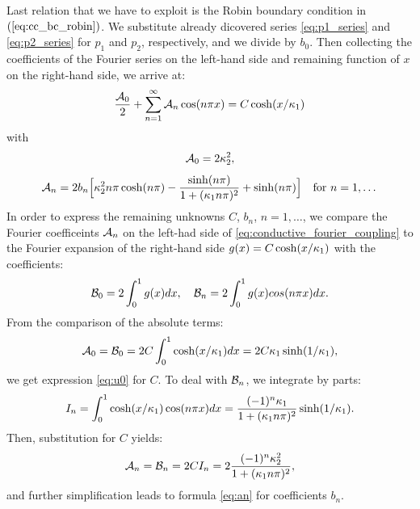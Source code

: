 \documentclass[sn-mathphys,Numbered]{sn-jnl}
\def\prtl{\partial} %
\begin{document}
Last relation that we have to exploit is the Robin boundary condition in $(\ref{eq:cc_bc_robin})$. We substitute already dicovered series \eqref{eq:p1_series} and \eqref{eq:p2_series} for $p_1$ and $p_2$, respectively, and we divide by $b_0$. Then collecting the coefficients of the Fourier series on the left-hand side and remaining function of $x$ on the right-hand side, we arrive at:
\begin{equation}
    \label{eq:conductive_fourier_coupling}
    \frac{{\cal A}_0}{2} + \sum^{\infty}_{n=1} {\cal A}_n \cos (n\pi x) =  C \cosh(x/\kappa_1)
\end{equation}
with
\begin{equation}
    \label{eq:fourier_A0}
    {\cal A}_0 = 2 \kappa_2^2,
\end{equation}
\begin{equation}
    \label{eq:fourier_An} 
        {\cal A}_n = 2 b_n \Bigl[ \kappa_2^2 n\pi \cosh(n\pi) - \frac{\sinh(n \pi)}{1 + (\kappa_1 n \pi)^2}  
    + \sinh(n \pi) \Bigr]\quad \text{for $n=1, \dots$}
\end{equation}
%
In order to express the remaining unknowns $C$, $b_n$, $n=1,\dots$,
we compare the Fourier coefficeints ${\cal A}_n$ on the left-had side of \eqref{eq:conductive_fourier_coupling}  to the Fourier expansion of the right-hand side $g(x)=C\cosh(x/\kappa_1)$ with the coefficients:
\[
   {\cal B}_0 = 2\int_0^1 g(x) dx, \quad {\cal B}_n = 2\int_0^1 g(x) cos(n \pi x) dx.
\]
%
From the comparison of the absolute terms:
\begin{equation}
    \label{eq:compute_A0}
    {\cal A}_0 = {\cal B}_0 = 2 C \int _0^1 \cosh(x/\kappa_1) dx =
    2  C \kappa_1\sinh(1/\kappa_1),
\end{equation}
%
we get expression \eqref{eq:u0} for $C$.
%
%
To deal with ${\cal B}_n$, we integrate by parts:
\[
 I_n = \int _0^1 \cosh(x/\kappa_1) \cos (n\pi x) dx 
    = \frac{(-1)^n \kappa_1}{1+(\kappa_1 n \pi)^2}\sinh(1/\kappa_1).
\]
Then, substitution for $C$ yields:
\begin{equation}
    \label{eq:compute_An}
    {\cal A}_n = {\cal B}_n = 2 C I_n =  2\frac{(-1)^n \kappa_2^2}{1+(\kappa_1 n \pi)^2},
\end{equation}
and further simplification leads to formula \eqref{eq:an} for coefficients $b_n$.
\end{document}
